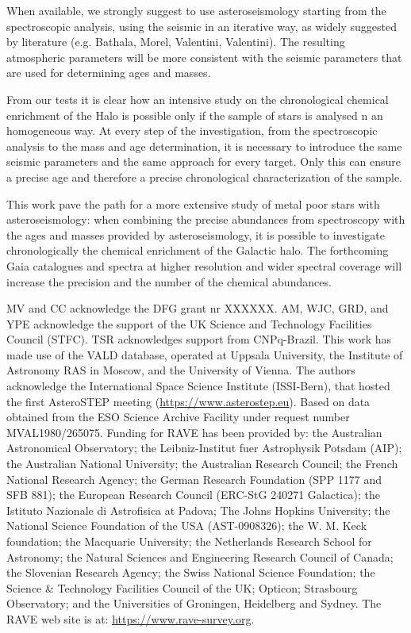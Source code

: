 \documentclass{aa}
\begin{document}
When available, we strongly suggest to use asteroseismology starting from the spectroscopic analysis, using the seismic \logg in an iterative way, as widely suggested by literature (e.g. Bathala, Morel, Valentini, Valentini). The resulting atmospheric parameters will be more consistent with the seismic parameters that are used for determining ages and masses. 

From our tests it is clear how an intensive study on the chronological chemical enrichment of the Halo is possible only if the sample of stars is analysed n an homogeneous way. At every step of the investigation, from the spectroscopic analysis to the mass and age determination, it is necessary to introduce the same seismic parameters and the same approach for every target. Only this can ensure a precise age and therefore a precise chronological characterization of the sample.

This work pave the path for a more extensive study of metal poor stars with asteroseismology: when combining the precise abundances from spectroscopy with the ages and masses provided by asteroseismology, it is possible to investigate chronologically the chemical enrichment of the Galactic halo. The forthcoming Gaia catalogues and spectra at higher resolution and wider spectral coverage will increase the precision and the number of the chemical abundances.

\begin{acknowledgements}
MV and CC acknowledge the DFG grant nr XXXXXX. AM, WJC, GRD, and YPE acknowledge the support of the UK Science and Technology Facilities Council (STFC). TSR acknowledges support from CNPq-Brazil. This work has made use of the VALD database, operated at Uppsala University, the Institute of Astronomy RAS in Moscow, and the University of Vienna. The authors acknowledge the International Space Science Institute (ISSI-Bern), that hosted the first AsteroSTEP meeting (\url{https://www.asterostep.eu}). Based on data obtained from the ESO Science Archive Facility under request number MVAL1980/265075. Funding for RAVE has been provided by: the Australian Astronomical Observatory; the Leibniz-Institut fuer Astrophysik Potsdam (AIP); the Australian National University; the Australian Research Council; the French National Research Agency; the German Research Foundation (SPP 1177 and SFB 881); the European Research Council (ERC-StG 240271 Galactica); the Istituto Nazionale di Astrofisica at Padova; The Johns Hopkins University; the National Science Foundation of the USA (AST-0908326); the W. M. Keck foundation; the Macquarie University; the Netherlands Research School for Astronomy; the Natural Sciences and Engineering Research Council of Canada; the Slovenian Research Agency; the Swiss National Science Foundation; the Science \& Technology Facilities Council of the UK; Opticon; Strasbourg Observatory; and the Universities of Groningen, Heidelberg and Sydney. The RAVE web site is at: \url{https://www.rave-survey.org}.
\end{acknowledgements}
\end{document}
